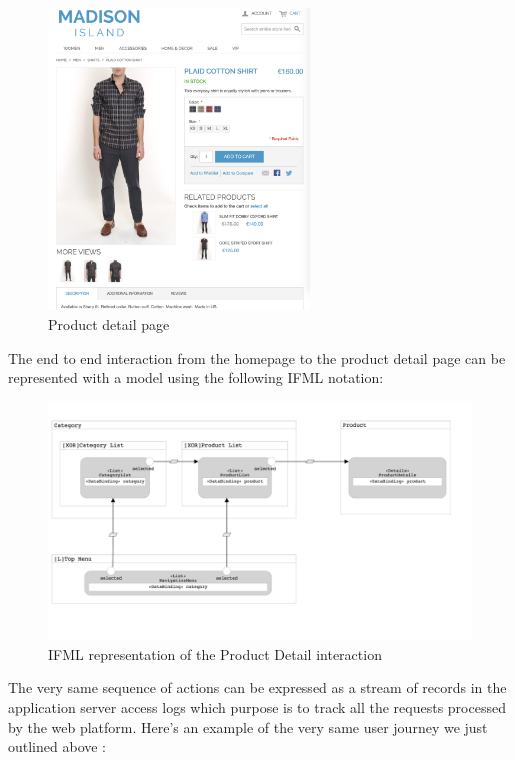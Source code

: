 \vspace{0.5cm}
\begin{figure}[H]
  \centering
    \includegraphics[height=8cm]{images/madison/product-detail.png}
  \caption{Product detail page}
  \label{fig:product-detail}
\end{figure}
\vspace{0.5cm}

The end to end interaction from the homepage to the product detail page can be represented with a model using the following IFML notation:

\vspace{0.5cm}
\begin{figure}[H]
  \centering
    \includegraphics[width=12cm]{images/madison/ifml1.png}
  \caption{IFML representation of the Product Detail interaction}
  \label{fig:ifml1}
\end{figure}
\vspace{0.5cm}

The very same sequence of actions can be expressed as a stream of records in the application server access logs which purpose is to track all the requests processed by the web platform. Here's an example of  the very same user journey we just outlined above :

